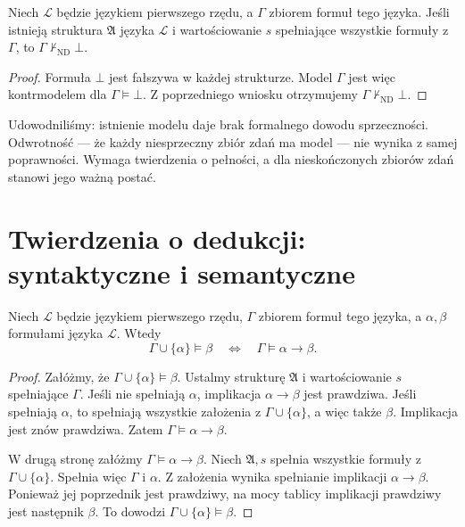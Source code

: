 \begin{wniosek}
\label{cor:soundness-consistency}
Niech $\mathcal L$ będzie językiem pierwszego rzędu,
a $\Gamma$ zbiorem formuł tego języka.
Jeśli istnieją struktura $\mathfrak A$ języka $\mathcal L$
i wartościowanie $s$ spełniające wszystkie
formuły z $\Gamma$, to
$\Gamma\nvdash_{\mathrm{ND}}\bot$.
\end{wniosek}
\begin{proof}
Formuła $\bot$ jest fałszywa w każdej strukturze.
Model $\Gamma$ jest więc kontrmodelem dla
$\Gamma\models\bot$. Z poprzedniego wniosku otrzymujemy
$\Gamma\nvdash_{\mathrm{ND}}\bot$.
\end{proof}

\begin{uwaga}
Udowodniliśmy: istnienie modelu daje brak formalnego dowodu
sprzeczności. Odwrotność — że każdy niesprzeczny zbiór zdań
ma model — nie wynika z samej poprawności.
Wymaga twierdzenia o pełności, a dla nieskończonych zbiorów zdań
stanowi jego ważną postać.
\end{uwaga}

\section{Twierdzenia o dedukcji: syntaktyczne i semantyczne}
\begin{twierdzenie}
\label{thm:soundness-semantic-deduction}
Niech $\mathcal L$ będzie językiem pierwszego rzędu,
$\Gamma$ zbiorem formuł tego języka, a $\alpha,\beta$
formułami języka $\mathcal L$. Wtedy
\[
\Gamma\cup\{\alpha\}\models\beta
\quad\Longleftrightarrow\quad
\Gamma\models\alpha\to\beta.
\]
\end{twierdzenie}
\begin{proof}
Załóżmy, że $\Gamma\cup\{\alpha\}\models\beta$.
Ustalmy strukturę $\mathfrak A$ i wartościowanie $s$
spełniające $\Gamma$. Jeśli nie spełniają $\alpha$,
implikacja $\alpha\to\beta$ jest prawdziwa.
Jeśli spełniają $\alpha$, to spełniają wszystkie założenia
z $\Gamma\cup\{\alpha\}$, a więc także $\beta$.
Implikacja jest znów prawdziwa. Zatem
$\Gamma\models\alpha\to\beta$.

W drugą stronę załóżmy
$\Gamma\models\alpha\to\beta$.
Niech $\mathfrak A,s$ spełnia wszystkie formuły z
$\Gamma\cup\{\alpha\}$. Spełnia więc $\Gamma$
i $\alpha$. Z założenia wynika spełnianie implikacji
$\alpha\to\beta$. Ponieważ jej poprzednik jest prawdziwy,
na mocy tablicy implikacji prawdziwy jest następnik $\beta$.
To dowodzi $\Gamma\cup\{\alpha\}\models\beta$.
\end{proof}

